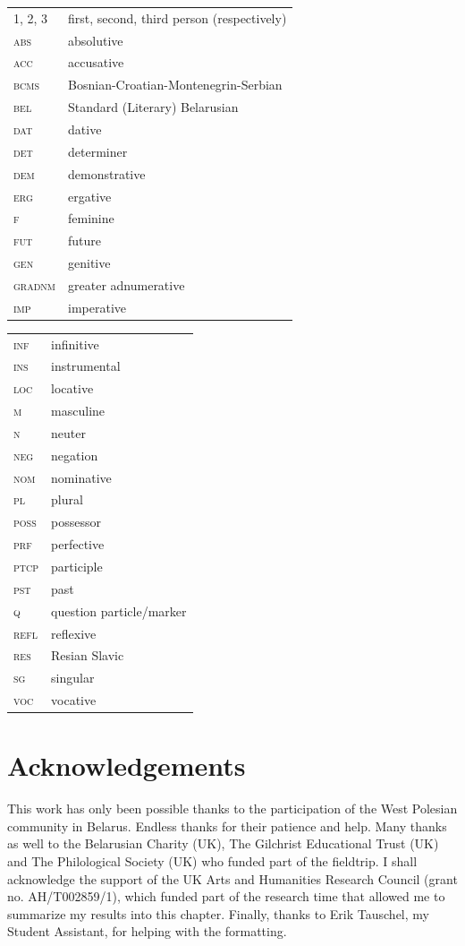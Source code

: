 \documentclass[output=paper,colorlinks,citecolor=brown]{langscibook}
\begin{document}
\begin{tabularx}{.5\textwidth}{@{}lQ@{}}
\textsc{1, 2, 3} & first, second, third person (respectively) \\
\textsc{abs} & absolutive \\
\textsc{acc} & accusative \\
\textsc{bcms} & Bosnian-Croatian-Montenegrin-Serbian \\
\textsc{bel} & Standard (Literary) Belarusian \\
\textsc{dat} & dative \\
\textsc{det} & determiner \\
\textsc{dem} & demonstrative \\
\textsc{erg} & ergative \\
\textsc{f} & feminine \\
\textsc{fut} & future \\
\textsc{gen} & genitive \\
\textsc{gradnm} & greater adnumerative \\
\textsc{imp} & imperative \\
\end{tabularx}%
\begin{tabularx}{.5\textwidth}{@{}lQ@{}}
\textsc{inf} & infinitive \\
\textsc{ins} & instrumental \\
\textsc{loc} & locative \\
\textsc{m} & masculine \\
\textsc{n} & neuter \\
\textsc{neg} & negation \\
\textsc{nom} & nominative \\
\textsc{pl} & plural \\
\textsc{poss} & possessor \\
\textsc{prf} & perfective \\
\textsc{ptcp} & participle \\
\textsc{pst} & past \\
\textsc{q} & question particle/marker \\
\textsc{refl} & reflexive \\
\textsc{res} & Resian Slavic \\
\textsc{sg} & singular \\
\textsc{voc} & vocative \\
\end{tabularx}

\section*{Acknowledgements}
This work has only been possible thanks to the participation of the West Polesian community in Belarus. Endless thanks for their patience and help. Many thanks as well to the Belarusian Charity (UK), The Gilchrist Educational Trust (UK) and The Philological Society (UK) who funded part of the fieldtrip. I shall acknowledge the support of the UK Arts and Humanities Research Council (grant no. AH/T002859/1), which funded part of the research time that allowed me to summarize my results into this chapter. Finally, thanks to Erik Tauschel, my Student Assistant, for helping with the formatting.
\end{document}
